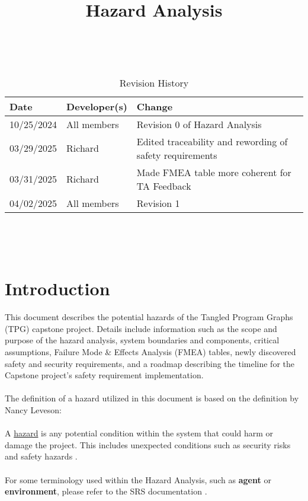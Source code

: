 \documentclass{article}
\title{Hazard Analysis\\\progname}
\author{\authname}
\date{}
\begin{document}
\maketitle
\thispagestyle{empty}

~\newpage


\begin{table}[hp]
\caption{Revision History} \label{TblRevisionHistory}
\begin{tabularx}{\textwidth}{llX}
\toprule
\textbf{Date} & \textbf{Developer(s)} & \textbf{Change}\\
\midrule
10/25/2024 & All members & Revision 0 of Hazard Analysis\\
03/29/2025 & Richard & Edited traceability and rewording of safety requirements \\
03/31/2025 & Richard & Made FMEA table more coherent for TA Feedback \\
04/02/2025 & All members & Revision 1\\
\bottomrule
\end{tabularx}
\end{table}

~\newpage

\tableofcontents

~\newpage



\section{Introduction}


This document describes the potential hazards of the Tangled Program Graphs (TPG) capstone project. Details include information such as the scope and purpose of the hazard analysis, system boundaries and components, critical assumptions, Failure Mode \& Effects Analysis (FMEA) tables, newly discovered safety and security requirements, and a roadmap describing the timeline for the Capstone project’s safety requirement implementation. 
\\\\
The definition of a hazard utilized in this document is based on the definition by Nancy Leveson:
\\\\
A \underline{hazard} is any potential condition within the system that could harm or damage the project. This includes unexpected conditions such as security risks and safety hazards \citep{Leveson2020}.
\\\\
For some terminology used within the Hazard Analysis, such as \textbf{agent} or \textbf{environment}, please refer to the SRS documentation \citep{SRS}.
\end{document}
